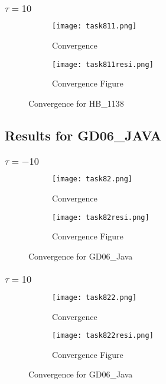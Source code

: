 \documentclass{article}
\begin{document}
\subsubsection{$\tau=10$}
\begin{figure}[H]
    \centering
    \begin{subfigure}{0.4\textwidth}
        \centering
        \texttt{[image: task811.png]}
        \caption{Convergence}
        \label{fig:task811}
    \end{subfigure}
    \begin{subfigure}{0.6\textwidth}
        \centering
        \texttt{[image: task811resi.png]}
        \caption{Convergence Figure}
        \label{fig:task811res}
    \end{subfigure}
    \caption{Convergence for HB\_1138}
    \label{fig:task81}
\end{figure}
\subsection{Results for GD06\_JAVA}
\subsubsection{$\tau=-10$}
\begin{figure}[H]
    \centering
    \begin{subfigure}{0.4\textwidth}
        \centering
        \texttt{[image: task82.png]}
        \caption{Convergence}
        \label{fig:task82}
    \end{subfigure}
    \begin{subfigure}{0.6\textwidth}
        \centering
        \texttt{[image: task82resi.png]}
        \caption{Convergence Figure}
        \label{fig:task82res}
    \end{subfigure}
    \caption{Convergence for GD06\_Java}
    \label{fig:task822}
\end{figure}
\subsubsection{$\tau=10$}
\begin{figure}[H]
    \centering
    \begin{subfigure}{0.4\textwidth}
        \centering
        \texttt{[image: task822.png]}
        \caption{Convergence}
        \label{fig:task822}
    \end{subfigure}
    \begin{subfigure}{0.6\textwidth}
        \centering
        \texttt{[image: task822resi.png]}
        \caption{Convergence Figure}
        \label{fig:task822res}
    \end{subfigure}
    \caption{Convergence for GD06\_Java}
    \label{fig:task822}
\end{figure}
\end{document}
